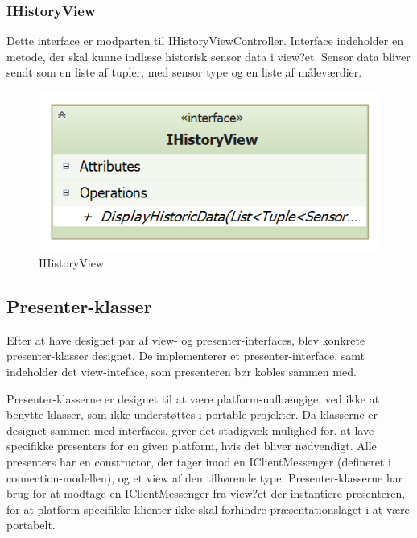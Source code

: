 \subsubsection{IHistoryView}
Dette interface er modparten til IHistoryViewController. Interface indeholder en metode, der skal kunne indlæse historisk sensor data i view?et. Sensor data bliver sendt som en liste af tupler, med sensor type og en liste af måleværdier.

\begin{figure}
	\centering
	\includegraphics[width=0.3\linewidth]{figs/design/application_ihistoryview}
	\caption{IHistoryView}
	\label{fig:application_ihistoryview}
\end{figure}

\subsection{Presenter-klasser}
Efter at have designet par af view- og presenter-interfaces, blev konkrete presenter-klasser designet. De implementerer et presenter-interface, samt indeholder det view-inteface, som presenteren bør kobles sammen med.

Presenter-klasserne er designet til at være platform-uafhængige, ved ikke at benytte klasser, som ikke understøttes i portable projekter. Da klasserne er designet sammen med interfaces, giver det stadigvæk mulighed for, at lave specifikke presenters for en given platform, hvis det bliver nødvendigt. Alle presenters har en constructor, der tager imod en IClientMessenger (defineret i connection-modellen), og et view af den tilhørende type. Presenter-klasserne har brug for at modtage en IClientMessenger fra view?et der instantiere presenteren, for at platform specifikke klienter ikke skal forhindre præsentationslaget i at være portabelt. 

